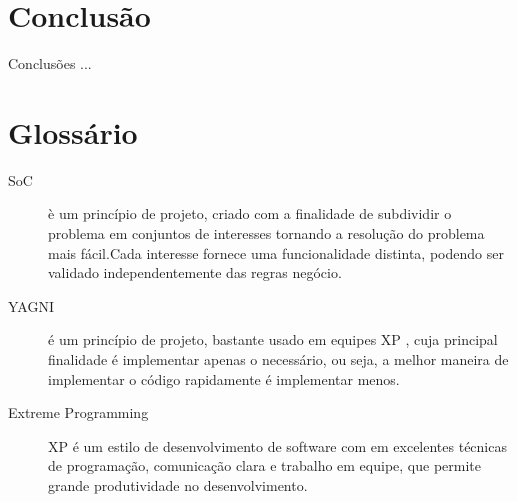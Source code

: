 \documentclass[tc,openright]{iiufrgs}
\begin{document}
\chapter{Conclusão}

Conclusões ...



\chapter*{Glossário}

\begin{description}
	\item[SoC] è um princípio de projeto, criado com a finalidade de subdividir o problema em conjuntos de interesses tornando a resolução do problema mais fácil.Cada interesse fornece uma funcionalidade distinta, podendo ser validado independentemente das regras negócio.\cite{pressman2010engineering}
	\item [YAGNI] é um princípio de projeto, bastante usado em equipes XP , cuja principal finalidade é implementar apenas o necessário, ou seja, a melhor maneira de implementar o código rapidamente é implementar menos.
	\item[Extreme Programming] XP é um estilo de desenvolvimento de software com em excelentes técnicas de programação, comunicação clara e trabalho em equipe, que permite grande produtividade no desenvolvimento. \cite{beck2004extreme}
\end{description}

\appendix
\end{document}
